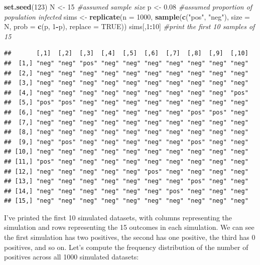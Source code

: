 \documentclass[
]{book}
\newenvironment{Shaded}{\begin{snugshade}}{\end{snugshade}}
\newcommand{\AttributeTok}[1]{\textcolor[rgb]{0.13,0.29,0.53}{#1}}
\newcommand{\CommentTok}[1]{\textcolor[rgb]{0.56,0.35,0.01}{\textit{#1}}}
\newcommand{\ConstantTok}[1]{\textcolor[rgb]{0.56,0.35,0.01}{#1}}
\newcommand{\DecValTok}[1]{\textcolor[rgb]{0.00,0.00,0.81}{#1}}
\newcommand{\FloatTok}[1]{\textcolor[rgb]{0.00,0.00,0.81}{#1}}
\newcommand{\FunctionTok}[1]{\textcolor[rgb]{0.13,0.29,0.53}{\textbf{#1}}}
\newcommand{\NormalTok}[1]{#1}
\newcommand{\OtherTok}[1]{\textcolor[rgb]{0.56,0.35,0.01}{#1}}
\newcommand{\SpecialCharTok}[1]{\textcolor[rgb]{0.81,0.36,0.00}{\textbf{#1}}}
\newcommand{\StringTok}[1]{\textcolor[rgb]{0.31,0.60,0.02}{#1}}
\begin{document}
\begin{Shaded}
\begin{Highlighting}[]
\FunctionTok{set.seed}\NormalTok{(}\DecValTok{123}\NormalTok{)}
\NormalTok{N }\OtherTok{\textless{}{-}} \DecValTok{15}    \CommentTok{\#assumed sample size}
\NormalTok{p }\OtherTok{\textless{}{-}} \FloatTok{0.08}  \CommentTok{\#assumed proportion of population infected}
\NormalTok{sims }\OtherTok{\textless{}{-}} \FunctionTok{replicate}\NormalTok{(}\AttributeTok{n =} \DecValTok{1000}\NormalTok{, }
                  \FunctionTok{sample}\NormalTok{(}\FunctionTok{c}\NormalTok{(}\StringTok{"pos"}\NormalTok{, }\StringTok{"neg"}\NormalTok{), }\AttributeTok{size =}\NormalTok{ N, }
                         \AttributeTok{prob =} \FunctionTok{c}\NormalTok{(p, }\DecValTok{1}\SpecialCharTok{{-}}\NormalTok{p), }\AttributeTok{replace =} \ConstantTok{TRUE}\NormalTok{))}
\NormalTok{sims[,}\DecValTok{1}\SpecialCharTok{:}\DecValTok{10}\NormalTok{] }\CommentTok{\#print the first 10 samples of 15}
\end{Highlighting}
\end{Shaded}

\begin{verbatim}
##       [,1]  [,2]  [,3]  [,4]  [,5]  [,6]  [,7]  [,8]  [,9]  [,10]
##  [1,] "neg" "neg" "pos" "neg" "neg" "neg" "neg" "neg" "neg" "neg"
##  [2,] "neg" "neg" "neg" "neg" "neg" "neg" "neg" "neg" "neg" "neg"
##  [3,] "neg" "neg" "neg" "neg" "neg" "neg" "neg" "neg" "neg" "neg"
##  [4,] "neg" "neg" "neg" "neg" "neg" "neg" "neg" "neg" "neg" "pos"
##  [5,] "pos" "pos" "neg" "neg" "neg" "neg" "neg" "neg" "neg" "neg"
##  [6,] "neg" "neg" "neg" "neg" "neg" "neg" "neg" "pos" "pos" "neg"
##  [7,] "neg" "neg" "neg" "neg" "neg" "neg" "neg" "neg" "neg" "neg"
##  [8,] "neg" "neg" "neg" "neg" "neg" "neg" "neg" "neg" "neg" "neg"
##  [9,] "neg" "pos" "neg" "neg" "neg" "neg" "neg" "pos" "neg" "neg"
## [10,] "neg" "neg" "neg" "neg" "neg" "neg" "neg" "neg" "neg" "neg"
## [11,] "pos" "neg" "neg" "neg" "neg" "neg" "neg" "neg" "neg" "neg"
## [12,] "neg" "neg" "neg" "neg" "neg" "pos" "neg" "neg" "neg" "neg"
## [13,] "neg" "neg" "neg" "neg" "neg" "neg" "neg" "pos" "neg" "neg"
## [14,] "neg" "neg" "neg" "neg" "neg" "neg" "pos" "neg" "neg" "neg"
## [15,] "neg" "neg" "neg" "neg" "neg" "neg" "neg" "neg" "neg" "neg"
\end{verbatim}

I've printed the first 10 simulated datasets, with columns representing
the simulation and rows representing the 15 outcomes in each simulation.
We can see the first simulation has two positives, the second has one
positive, the third has 0 positives, and so on. Let's compute the
frequency distribution of the number of positives across all 1000
simulated datasets:
\end{document}
